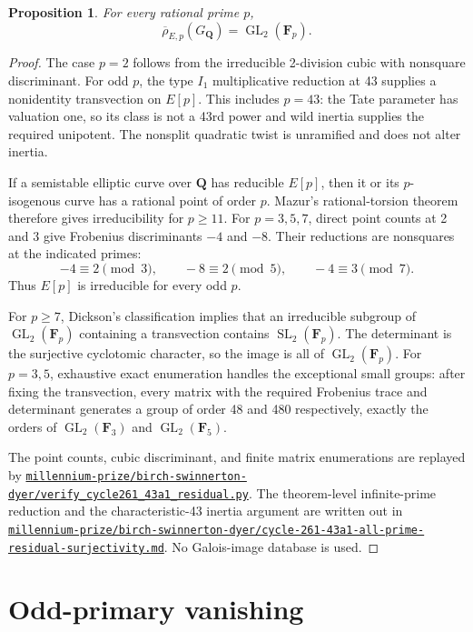 \documentclass[11pt]{article}
\newtheorem{proposition}[theorem]{Proposition}
\newcommand{\Q}{\mathbf Q}
\newcommand{\F}{\mathbf F}
\newcommand{\artifact}[1]{\href{run:../#1}{\nolinkurl{#1}}}
\begin{document}
\begin{proposition}\label{prop:image}
For every rational prime \(p\),
\[
 \overline\rho_{E,p}(G_\Q)=\operatorname{GL}_2(\F_p).
\]
\end{proposition}

\begin{proof}
The case \(p=2\) follows from the irreducible 2-division cubic with nonsquare
discriminant.  For odd \(p\), the type \(I_1\) multiplicative reduction at 43
supplies a nonidentity transvection on \(E[p]\).  This includes \(p=43\): the
Tate parameter has valuation one, so its class is not a 43rd power and wild
inertia supplies the required unipotent.  The nonsplit quadratic twist is
unramified and does not alter inertia.

If a semistable elliptic curve over \(\Q\) has reducible \(E[p]\), then it or
its \(p\)-isogenous curve has a rational point of order \(p\).  Mazur's
rational-torsion theorem therefore gives irreducibility for \(p\geq11\).
For \(p=3,5,7\), direct point counts at 2 and 3 give Frobenius discriminants
\(-4\) and \(-8\).  Their reductions are nonsquares at the indicated primes:
\[
 -4\equiv2\pmod3,
 \qquad -8\equiv2\pmod5,
 \qquad -4\equiv3\pmod7.
\]
Thus \(E[p]\) is irreducible for every odd \(p\).

For \(p\geq7\), Dickson's classification implies that an irreducible subgroup
of \(\operatorname{GL}_2(\F_p)\) containing a transvection contains
\(\operatorname{SL}_2(\F_p)\).  The determinant is the surjective cyclotomic
character, so the image is all of \(\operatorname{GL}_2(\F_p)\).  For
\(p=3,5\), exhaustive exact enumeration handles the exceptional small groups:
after fixing the transvection, every matrix with the required Frobenius trace
and determinant generates a group of order 48 and 480 respectively, exactly
the orders of \(\operatorname{GL}_2(\F_3)\) and
\(\operatorname{GL}_2(\F_5)\).

The point counts, cubic discriminant, and finite matrix enumerations are
replayed by
\artifact{millennium-prize/birch-swinnerton-dyer/verify_cycle261_43a1_residual.py}.
The theorem-level infinite-prime reduction and the characteristic-43 inertia
argument are written out in
\artifact{millennium-prize/birch-swinnerton-dyer/cycle-261-43a1-all-prime-residual-surjectivity.md}.
No Galois-image database is used.
\end{proof}

\section{Odd-primary vanishing}
\end{document}
